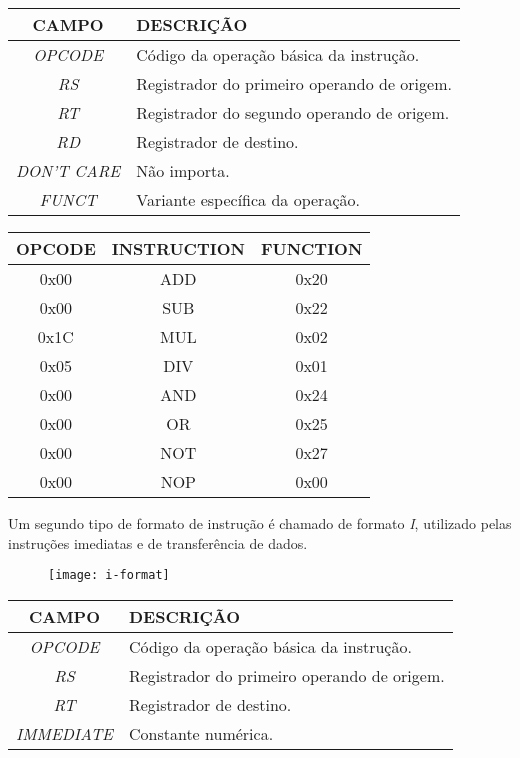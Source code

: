 \begin{table}[H]
\centering	
\begin{tabular}{|c|l|}
	\hline 
	\cellcolor[gray]{0.9}\textbf{CAMPO} & \cellcolor[gray]{0.9}\textbf{DESCRIÇÃO} \\ 
	\hline 
	\textit{OPCODE} & Código da operação básica da instrução. \\ 
	\hline 
	\textit{RS} & Registrador do primeiro operando de origem. \\ 
	\hline 
	\textit{RT} & Registrador do segundo operando de origem. \\ 
	\hline 
	\textit{RD} & Registrador de destino. \\ 
	\hline 
	\textit{DON'T CARE} & Não importa. \\ 
	\hline 
	\textit{FUNCT} & Variante específica da operação. \\ 
	\hline 
	\end{tabular} 
	\end{table}	

\begin{table}[H]
\centering
	\begin{tabular}{|c|c|c|}
  	\hline 
  	\cellcolor[gray]{0.9}\textbf{OPCODE} & \cellcolor[gray]{0.9}\textbf{INSTRUCTION} & \cellcolor[gray]{0.9}\textbf{FUNCTION} \\ 
  	\hline 
  	0x00 & ADD & 0x20 \\ 
  	\hline 
  	0x00 & SUB & 0x22 \\ 
  	\hline 
  	0x1C & MUL & 0x02 \\ 
  	\hline 
  	0x05 & DIV & 0x01 \\ 
  	\hline 
  	0x00 & AND & 0x24 \\ 
  	\hline 
  	0x00 & OR & 0x25 \\ 
  	\hline  
  	0x00 & NOT & 0x27 \\ 
  	\hline
  	0x00 & NOP & 0x00 \\
  	\hline 
  	\end{tabular} 
  \end{table} 
  	 	
	 Um segundo tipo de formato de instrução é chamado de formato \textit{I}, utilizado pelas instruções imediatas e de transferência de dados.
	\begin{figure}[H]
    	\centering
    	\texttt{[image: i-format]}
  	\end{figure}
  	
  	\begin{table}[H]
\centering	
\begin{tabular}{|c|l|}
	\hline 
	\cellcolor[gray]{0.9}\textbf{CAMPO} & \cellcolor[gray]{0.9}\textbf{DESCRIÇÃO} \\ 
	\hline 
	\textit{OPCODE} & Código da operação básica da instrução. \\ 
	\hline 
	\textit{RS} & Registrador do primeiro operando de origem. \\ 
	\hline 
	\textit{RT} & Registrador de destino. \\ 
	\hline 
	\textit{IMMEDIATE} & Constante numérica. \\ 
	\hline 
	\end{tabular} 
	\end{table}
	
